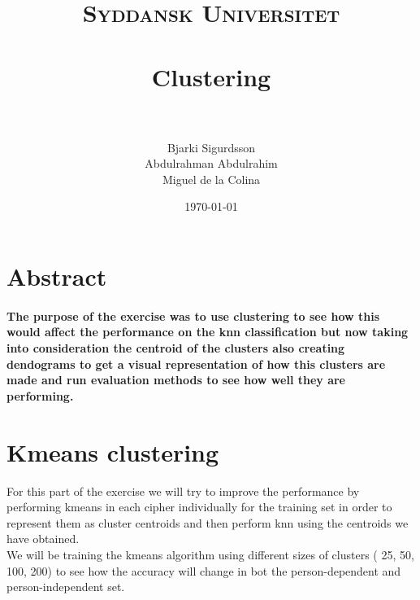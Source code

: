 \documentclass[paper=a4, fontsize=11pt]{scrartcl} %
\title{	
\normalfont \normalsize 
\textsc{Syddansk Universitet} \\ [25pt] 
\horrule{0.5pt} \\[0.4cm] %
\huge Clustering \\ %
\horrule{2pt} \\[0.5cm] %
}
\author{Bjarki Sigurdsson \\ Abdulrahman Abdulrahim \\ Miguel de la Colina}
\date{\normalsize\today} %
\begin{document}
\maketitle %



\section*{Abstract}

\paragraph{The purpose of the exercise was to use clustering to see how this would affect the performance on the knn classification but now taking into consideration the centroid of the clusters also creating dendograms to get a visual representation of how this clusters are made and run evaluation methods to see how well they are performing.}




\section{Kmeans clustering}
For this part of the exercise we will try to improve the performance by performing kmeans in each cipher individually for the training set in order to represent them as cluster centroids and then perform knn using the centroids we have obtained. \\

We will be training the kmeans algorithm using different sizes of clusters ( 25, 50, 100, 200) to see how the accuracy  will change in bot the person-dependent and person-independent set. 
\end{document}
